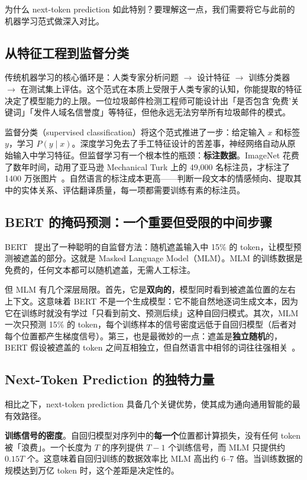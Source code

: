 为什么 next-token prediction 如此特别？要理解这一点，我们需要将它与此前的机器学习范式做深入对比。

\subsection{从特征工程到监督分类}

传统机器学习的核心循环是：人类专家分析问题 $\to$ 设计特征 $\to$ 训练分类器 $\to$ 在测试集上评估。这个范式在本质上受限于人类专家的认知，你能提取的特征决定了模型能力的上限。一位垃圾邮件检测工程师可能设计出「是否包含'免费'关键词」「发件人域名信誉度」等特征，但他永远无法穷举所有垃圾邮件的模式。

监督分类（supervised classification）将这个范式推进了一步：给定输入 $x$ 和标签 $y$，学习 $P(y \mid x)$。深度学习免去了手工特征设计的苦差事，神经网络自动从原始输入中学习特征。但监督学习有一个根本性的瓶颈：\textbf{标注数据}。ImageNet 花费了数年时间，动用了亚马逊 Mechanical Turk 上的 49,000 名标注员，才标注了 1400 万张图片~\cite{deng2009imagenet}。自然语言的标注成本更高——判断一段文本的情感倾向、提取其中的实体关系、评估翻译质量，每一项都需要训练有素的标注员。

\subsection{BERT 的掩码预测：一个重要但受限的中间步骤}

BERT~\cite{devlin2019bert} 提出了一种聪明的自监督方法：随机遮盖输入中 15\% 的 token，让模型预测被遮盖的部分。这就是 Masked Language Model（MLM）。MLM 的训练数据是免费的，任何文本都可以随机遮盖，无需人工标注。

但 MLM 有几个深层局限。首先，它是\textbf{双向的}，模型同时看到被遮盖位置的左右上下文。这意味着 BERT 不是一个生成模型：它不能自然地逐词生成文本，因为它在训练时就没有学过「只看到前文、预测后续」这种自回归模式。其次，MLM 一次只预测 15\% 的 token，每个训练样本的信号密度远低于自回归模型（后者对每个位置都产生梯度信号）。第三，也是最微妙的一点：遮盖是\textbf{独立随机}的，BERT 假设被遮盖的 token 之间互相独立，但自然语言中相邻的词往往强相关~\cite{yang2019xlnet}。

\subsection{Next-Token Prediction 的独特力量}

相比之下，next-token prediction 具备几个关键优势，使其成为通向通用智能的最有效路径。

\textbf{训练信号的密度}。自回归模型对序列中的\textbf{每一个}位置都计算损失，没有任何 token 被「浪费」。一个长度为 $T$ 的序列提供 $T-1$ 个训练信号，而 MLM 只提供约 $0.15T$ 个。这意味着自回归训练的数据效率比 MLM 高出约 6--7 倍。当训练数据的规模达到万亿 token 时，这个差距是决定性的。

